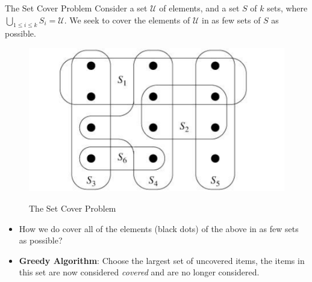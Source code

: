 \documentclass[final]{beamer}
\newlength{\colwidth}
\begin{document}
\begin{frame}[t]
\begin{columns}[t]
\begin{column}{\colwidth}
\begin{block}{The Set Cover Problem}
  Consider a set $\mathcal{U}$ of elements, and a set $S$ of $k$ sets, where
  $\bigcup_{1 \leq i \leq k}S_i = \mathcal{U}$. We seek to cover the elements of $\mathcal{U}$ in as few
  sets of $S$ as possible.
    \begin{figure}
      \includegraphics[width=0.5\colwidth]{figures/set_cover.png}
      \label{fig:library}
      \caption{The Set Cover Problem}
    \end{figure}
    \begin{itemize}
      \item How we do cover all of the elements (black dots) of the above in as few sets as possible?
      \item \textbf{Greedy Algorithm}: Choose the largest set of uncovered items, the items in this set are now considered \emph{covered} and are no longer considered.
    \end{itemize}
\end{block}


\end{column}
\end{columns}
\end{frame}
\end{document}
